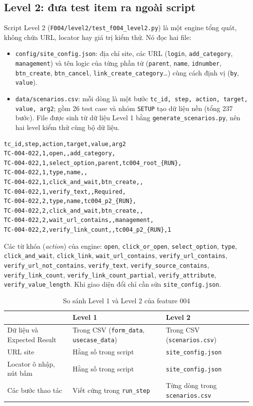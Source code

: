 \documentclass[12pt,a4paper]{article}
\begin{document}
\subsection{Level 2: đưa test item ra ngoài script}
Script Level 2 (\texttt{F004/level2/test\_f004\_level2.py}) là một engine tổng quát, không chứa URL, locator hay giá trị kiểm thử. Nó đọc hai file:
\begin{itemize}[noitemsep]
  \item \texttt{config/site\_config.json}: địa chỉ site, các URL (\texttt{login}, \texttt{add\_category}, \texttt{management}) và tên logic của từng phần tử (\texttt{parent}, \texttt{name}, \texttt{idnumber}, \texttt{btn\_create}, \texttt{btn\_cancel}, \texttt{link\_create\_category}\ldots) cùng cách định vị (\texttt{by}, \texttt{value}).
  \item \texttt{data/scenarios.csv}: mỗi dòng là một bước \texttt{tc\_id, step, action, target, value, arg2}; gồm 26 test case và nhóm \texttt{SETUP} tạo dữ liệu nền (tổng 237 bước). File được sinh từ dữ liệu Level 1 bằng \texttt{generate\_scenarios.py}, nên hai level kiểm thử cùng bộ dữ liệu.
\end{itemize}
\begin{lstlisting}
tc_id,step,action,target,value,arg2
TC-004-022,1,open,,add_category,
TC-004-022,1,select_option,parent,tc004_root_{RUN},
TC-004-022,1,type,name,,
TC-004-022,1,click_and_wait,btn_create,,
TC-004-022,1,verify_text,,Required,
TC-004-022,2,type,name,tc004_p2_{RUN},
TC-004-022,2,click_and_wait,btn_create,,
TC-004-022,2,wait_url_contains,,management,
TC-004-022,2,verify_link_count,,tc004_p2_{RUN},1
\end{lstlisting}
Các từ khóa (\textit{action}) của engine: \texttt{open}, \texttt{click\_or\_open}, \texttt{select\_option}, \texttt{type}, \texttt{click\_and\_wait}, \texttt{click\_link}, \texttt{wait\_url\_contains}, \texttt{verify\_url\_contains}, \texttt{verify\_url\_not\_contains}, \texttt{verify\_text}, \texttt{verify\_source\_contains}, \texttt{verify\_link\_count}, \texttt{verify\_link\_count\_partial}, \texttt{verify\_attribute}, \texttt{verify\_value\_length}. Khi giao diện đổi chỉ cần sửa \texttt{site\_config.json}.

\begin{table}[H]
\centering\small
\begin{tabular}{|L{3.4cm}|L{5.4cm}|L{5.4cm}|}
\hline
{} & \textbf{Level 1} & \textbf{Level 2} \\ \hline
Dữ liệu và Expected Result & Trong CSV (\texttt{form\_data}, \texttt{usecase\_data}) & Trong CSV (\texttt{scenarios.csv}) \\ \hline
URL site & Hằng số trong script & \texttt{site\_config.json} \\ \hline
Locator ô nhập, nút bấm & Hằng số trong script & \texttt{site\_config.json} \\ \hline
Các bước thao tác & Viết cứng trong \texttt{run\_step} & Từng dòng trong \texttt{scenarios.csv} \\ \hline
\end{tabular}
\caption{So sánh Level 1 và Level 2 của feature 004}
\end{table}
\end{document}
